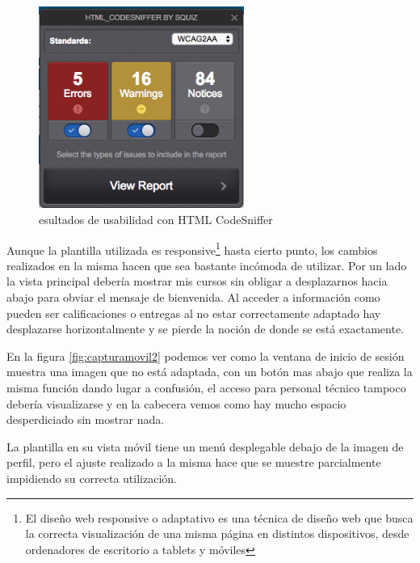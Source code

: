 \begin{figure}[H]
\centering
\includegraphics[width=0.6\textwidth]{../screenshots/htmlcodesniffer}
\caption{esultados de usabilidad con HTML CodeSniffer}
\label{fig:htmlcodesniffer}
\end{figure}


\bigskip
Aunque la plantilla utilizada es responsive\footnote{El diseño web responsive o adaptativo es una técnica de diseño web que busca la correcta visualización de una misma página en distintos dispositivos, desde ordenadores de escritorio a tablets y móviles} hasta cierto punto, los cambios realizados en la misma hacen que sea bastante incómoda de utilizar. Por un lado la vista principal debería mostrar mis cursos sin obligar a desplazarnos hacia abajo para obviar el mensaje de bienvenida. Al acceder a información como pueden ser calificaciones o entregas al no estar correctamente adaptado hay desplazarse horizontalmente y se pierde la noción de donde se está exactamente.

\bigskip
En la figura \ref{fig:capturamovil2} podemos ver como la ventana de inicio de sesión muestra una imagen que no está adaptada, con un botón mas abajo que realiza la misma función dando lugar a confusión, el acceso para personal técnico tampoco debería visualizarse y en la cabecera vemos como hay mucho espacio desperdiciado sin mostrar nada.

\bigskip
La plantilla en su vista móvil tiene un menú desplegable debajo de la imagen de perfil, pero el ajuste realizado a la misma hace que se muestre parcialmente impidiendo su correcta utilización.


